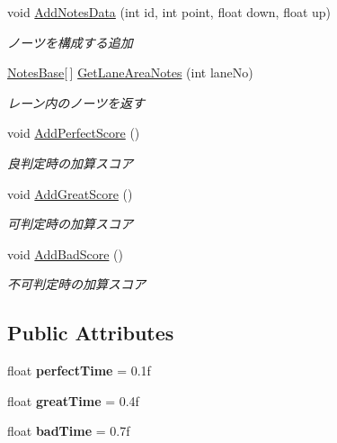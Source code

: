 \begin{DoxyCompactItemize}
\item 
void \hyperlink{class_notes_manager_a4a2a80e4a52c701ec09c6911cb5e0d2c}{Add\+Notes\+Data} (int id, int point, float down, float up)
\begin{DoxyCompactList}\small\item\em ノーツを構成する追加 \end{DoxyCompactList}\item 
\hyperlink{class_notes_base}{Notes\+Base}\mbox{[}$\,$\mbox{]} \hyperlink{class_notes_manager_ad0f90502e260178cf41ba3ec92cc3fcb}{Get\+Lane\+Area\+Notes} (int lane\+No)
\begin{DoxyCompactList}\small\item\em レーン内のノーツを返す \end{DoxyCompactList}\item 
void \hyperlink{class_notes_manager_a002c55a58d51fb7913a318005fd68edc}{Add\+Perfect\+Score} ()
\begin{DoxyCompactList}\small\item\em 良判定時の加算スコア \end{DoxyCompactList}\item 
void \hyperlink{class_notes_manager_ac6935fc8ab7e7b078f89777355d110ab}{Add\+Great\+Score} ()
\begin{DoxyCompactList}\small\item\em 可判定時の加算スコア \end{DoxyCompactList}\item 
void \hyperlink{class_notes_manager_adcdb5132e598c4d160197c6bfd2ca644}{Add\+Bad\+Score} ()
\begin{DoxyCompactList}\small\item\em 不可判定時の加算スコア \end{DoxyCompactList}\end{DoxyCompactItemize}
\subsection*{Public Attributes}
\begin{DoxyCompactItemize}
\item 
float {\bfseries perfect\+Time} = 0.\+1f\hypertarget{class_notes_manager_af2d67fbf2a1f1aeeb1f77bcdb990bfe4}{}\label{class_notes_manager_af2d67fbf2a1f1aeeb1f77bcdb990bfe4}

\item 
float {\bfseries great\+Time} = 0.\+4f\hypertarget{class_notes_manager_a9fc673597e58d17984e3614ca826fb2b}{}\label{class_notes_manager_a9fc673597e58d17984e3614ca826fb2b}

\item 
float {\bfseries bad\+Time} = 0.\+7f\hypertarget{class_notes_manager_a2873161ada543ab35986a562fca4676f}{}\label{class_notes_manager_a2873161ada543ab35986a562fca4676f}

\end{DoxyCompactItemize}
